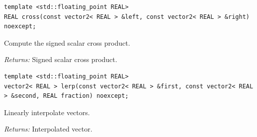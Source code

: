 \par\noindent\begin{minipage}{\linewidth}
\begin{lstlisting}[style=apireference]
template <std::floating_point REAL>
REAL cross(const vector2< REAL > &left, const vector2< REAL > &right) noexcept;
\end{lstlisting}
{\footnotesize Compute the signed scalar cross product.\par}
{\footnotesize\textit{Returns:} Signed scalar cross product.\par}
\end{minipage}\par\vspace{1pt}
\par\noindent\begin{minipage}{\linewidth}
\begin{lstlisting}[style=apireference]
template <std::floating_point REAL>
vector2< REAL > lerp(const vector2< REAL > &first, const vector2< REAL > &second, REAL fraction) noexcept;
\end{lstlisting}
{\footnotesize Linearly interpolate vectors.\par}
{\footnotesize\textit{Returns:} Interpolated vector.\par}
\end{minipage}\par\vspace{1pt}
